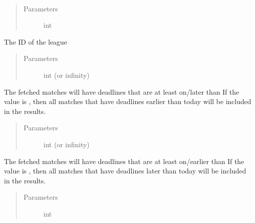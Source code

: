 \documentclass[letterpaper,10pt,english]{sphinxmanual}
\begin{document}
\begin{fulllineitems}
\label{\detokenize{tiger_leagues/models/readme:tiger_leagues.models.league_model.get_matches_in_current_window}}~\begin{quote}\begin{description}
\item[{Parameters}] \leavevmode
{} \textendash{} int

\end{description}\end{quote}

The ID of the league
\begin{quote}\begin{description}
\item[{Parameters}] \leavevmode
{} \textendash{} int (or infinity)

\end{description}\end{quote}

The fetched matches will have deadlines that are at least on/later than 
If the value is , then all matches that have deadlines earlier than 
today will be included in the results.
\begin{quote}\begin{description}
\item[{Parameters}] \leavevmode
{} \textendash{} int (or infinity)

\end{description}\end{quote}

The fetched matches will have deadlines that are at least on/earlier than 
If the value is , then all matches that have deadlines later than 
today will be included in the results.
\begin{quote}\begin{description}
\item[{Parameters}] \leavevmode
{} \textendash{} int


\end{description}
\end{quote}
\end{fulllineitems}
\end{document}
